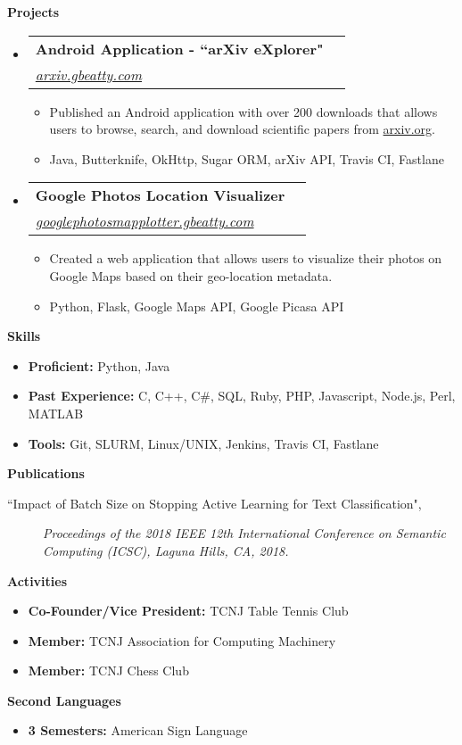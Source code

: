 \documentclass[letterpaper,10pt]{article}
\makeatletter
\newcommand{\resitem}[1]{\item #1 \vspace{-2pt}}
\newcommand{\resheading}[1]{{\large \colorbox{mygrey}{\begin{minipage}{\textwidth}{\textbf{#1 \vphantom{p\^{E}}}}\end{minipage}}}}
\newcommand{\ressubheading}[4]{
\begin{tabular*}{7.0in}{l@{\extracolsep{\fill}}r}
		\textbf{#1} & #2 \\
		\textit{#3} & \textit{#4} \\
\end{tabular*}\vspace{-6pt}}
\makeatother
\begin{document}
\resheading{Projects}
\begin{itemize}
\item
	\ressubheading{Android Application - ``arXiv eXplorer"}{}{\href{http://arxiv.gbeatty.com}{arxiv.gbeatty.com}}{}
	\begin{itemize}
		\resitem{Published an Android application with over 200 downloads that allows users to browse, search, and download scientific papers from \href{http://arxiv.org}{arxiv.org}.}
		\resitem{Java, Butterknife, OkHttp, Sugar ORM, arXiv API, Travis CI, Fastlane}
	\end{itemize}

\item
	\ressubheading{Google Photos Location Visualizer}{}{\href{http://googlephotosmapplotter.gbeatty.com}{googlephotosmapplotter.gbeatty.com}}{}
	\begin{itemize}
		\resitem{Created a web application that allows users to visualize their photos on Google Maps based on their geo-location metadata.}
		\resitem{Python, Flask, Google Maps API, Google Picasa API}
	\end{itemize}

\end{itemize}

\resheading{Skills}
	\begin{itemize}
	\resitem{\textbf{Proficient:} Python, Java}
	\resitem{\textbf{Past Experience:} C, C++, C\#, SQL, Ruby, PHP, Javascript, Node.js, Perl, MATLAB}
	\resitem{\textbf{Tools:} Git, SLURM, Linux/UNIX, Jenkins, Travis CI, Fastlane}
	\end{itemize}

\resheading{Publications}
\begin{description}
\item[``Impact of Batch Size on Stopping Active Learning for Text Classification",]
\emph{Proceedings of the 2018 IEEE 12th International Conference on Semantic Computing (ICSC), Laguna Hills, CA, 2018.}
\end{description}
\resheading{Activities}
	\begin{itemize}
	\resitem{\textbf{Co-Founder/Vice President:} TCNJ Table Tennis Club}
	\resitem{\textbf{Member:} TCNJ Association for Computing Machinery}
	\resitem{\textbf{Member:} TCNJ Chess Club}
	\end{itemize}
\resheading{Second Languages}
	\begin{itemize}
	\resitem{\textbf{3 Semesters:} American Sign Language}
	\end{itemize}
\end{document}
